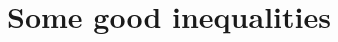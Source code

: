 \documentclass[biber,draft]{nowfnt} %
\begin{document}
%

\appendix

\chapter{Some good inequalities}


\backmatter  %

\printbibliography
\end{document}
